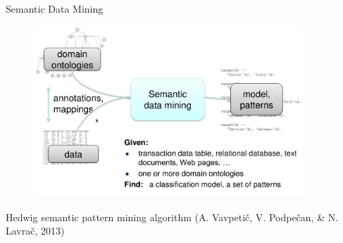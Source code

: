 \documentclass[first=dgreen,second=purple,logo=redexc]{aaltoslides}
\begin{document}

\begin{frame} {Semantic Data Mining} 

      \begin{figure}
      \centering
      \includegraphics[trim=1cm 0.5cm 1cm 1cm, clip=true, width=0.9\textwidth]{figures/semantic}
      \end{figure}
      
      \vspace{-5mm}
Hedwig semantic pattern mining algorithm (A. Vavpeti\v{c}, V. Podpe\v{c}an, \& N. Lavra\v{c}, 2013)

\end{frame}

\end{document}
